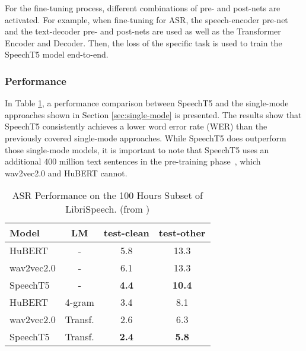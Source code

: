 For the fine-tuning process, different combinations of pre- and post-nets are activated. For example, when fine-tuning for ASR, the speech-encoder pre-net and the text-decoder pre- and post-nets are used as well as the Transformer Encoder and Decoder. Then, the loss of the specific task is used to train the SpeechT5 model end-to-end.
\subsubsection{Performance}
In Table \ref{table:speecht5_performance}, a performance comparison between SpeechT5 and the single-mode approaches shown in Section \ref{sec:single-mode} is presented. The results show that SpeechT5 consistently achieves a lower word error rate (WER) than the previously covered single-mode approaches. While SpeechT5 does outperform those single-mode models, it is important to note that SpeechT5 uses an additional 400 million text sentences in the pre-training phase~\cite{speecht5}, which wav2vec2.0 and HuBERT cannot.

\begin{table}[htbp]
    \centering
    \begin{tabular}{l c c c}
    \hline
    \textbf{Model} & LM & test-clean & test-other\\
    \hline
    HuBERT&-&5.8&13.3\\
    wav2vec2.0&-&6.1&13.3\\
    SpeechT5&-&\textbf{4.4}&\textbf{10.4}\\
    \hline
    HuBERT&4-gram&3.4&8.1\\
    wav2vec2.0&Transf.&2.6&6.3\\
    SpeechT5&Transf.&\textbf{2.4}&\textbf{5.8}\\
    \hline
    \end{tabular}
    \caption{\label{table:speecht5_performance}ASR Performance on the 100 Hours Subset of LibriSpeech. (from \citealt{speecht5})}
\end{table}